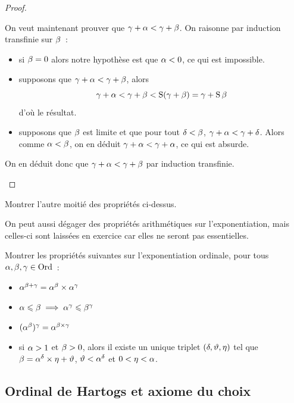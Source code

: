 \begin{proof}
\begin{itemize}
    On veut maintenant prouver que $\gamma + \alpha < \gamma + \beta$. On
    raisonne par induction transfinie sur $\beta$~:
    \begin{itemize}
    \item si $\beta = 0$ alors notre hypothèse est que $\alpha < 0$, ce qui est
      impossible.
    \item supposons que $\gamma + \alpha < \gamma + \beta$, alors
      \[\gamma + \alpha < \gamma + \beta < \operatorname{S}(\gamma + \beta)
      = \gamma + \operatorname{S}\beta\]
      d'où le résultat.
    \item supposons que $\beta$ est limite et que pour tout $\delta < \beta$,
      $\gamma + \alpha < \gamma + \delta$. Alors comme $\alpha < \beta$, on en
      déduit $\gamma + \alpha < \gamma + \alpha$, ce qui est absurde.
    \end{itemize}
    On en déduit donc que $\gamma + \alpha < \gamma + \beta$ par induction
    transfinie.\qedhere
  \end{itemize}
\end{proof}

\begin{exercise}
  Montrer l'autre moitié des propriétés ci-dessus.
\end{exercise}

On peut aussi dégager des propriétés arithmétiques sur l'exponentiation, mais
celles-ci sont laissées en exercice car elles ne seront pas essentielles.

\begin{exercise}\label{exo.ord.arith}
  Montrer les propriétés suivantes sur l'exponentiation ordinale, pour tous
  $\alpha,\beta,\gamma\in\operatorname{Ord}$~:
  \begin{itemize}
  \item $\alpha^{\beta+\gamma} = \alpha^\beta\times\alpha^\gamma$
  \item $\alpha \leqslant \beta \implies \alpha^\gamma\leqslant\beta^\gamma$
  \item $(\alpha^\beta)^\gamma = \alpha^{\beta\times\gamma}$
  \item si $\alpha > 1$ et $\beta >0$, alors il existe un unique triplet
    $(\delta,\vartheta,\eta)$ tel que
    $\beta = \alpha^\delta\times\eta + \vartheta$, $\vartheta < \alpha^\delta$
    et $0 < \eta < \alpha$.
  \end{itemize}
\end{exercise}

\subsection{Ordinal de Hartogs et axiome du choix}\label{sbsct.Zorn}

